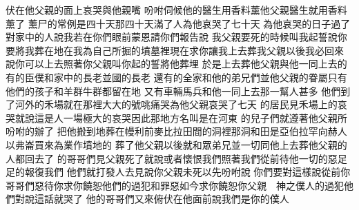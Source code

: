\bchapter%
伏在他父親的面上哀哭\chientien 與他親嘴\chuan 
{}吩咐伺候他的醫生\chientien 用香料薰他父親\chientien 醫生就用香料薰了\chuan
{}薰尸的常例是四十天\chientien 那四十天滿了\chientien{}人為他哀哭了七十天\chuan\Chuan
{}為他哀哭的日子過了\chientien{}對家中的人說\chientien 我若在你們眼前蒙恩\chientien 請你們報告說\chientien 
{}我父親要死的時候\chientien 叫我起誓\chientien 說\chientien 你要將我葬在地\chientien 在我為自己所掘的墳墓裡\yuentien 現在求你讓我上去葬我父親\chientien 以後我必回來\chuan 
{}說\chientien 你可以上去\chientien 照著你父親叫你起的誓\chientien 將他葬埋\chuan 
{}於是上去葬他父親\yuentien 與他一同上去的\chientien 有的臣僕\chientien 和家中的長老\chientien 並國的長老\yuentien 
{}還有的全家\chientien 和他的弟兄們\chientien 並他父親的眷屬\chientien 只有他們的\chientien 孩子\chientien 和羊群\chientien 牛群\chientien 都留在地\yuentien 
{}又有車輛\chientien 馬兵\chientien 和他一同上去\yuentien 那一幫人甚多\chuan 
{}他們到了河外\chientien{}的禾場\chientien 就在那裡大大的號咷痛哭\yuentien{}為他父親哀哭了七天\chuan 
{}的居民\chientien 見禾場上的哀哭\chientien 就說\chientien 這是人一場極大的哀哭\chientien 因此那地方名叫\chientien 是在河東\chuan 
{}的兒子們\chientien 就遵著他父親所吩咐的辦了\chientien 
{}把他搬到地\chientien 葬在幔利前\chientien 麥比拉田間的洞裡\yuentien 那洞和田\chientien 是亞伯拉罕向赫人以弗崙買來為業作墳地的\chuan 
{}葬了他父親以後\chientien 就和眾弟兄\chientien 並一切同他上去葬他父親的人\chientien 都回去了\chuan\Chuan
{}的哥哥們見父親死了\chientien 就說\chientien 或者懷恨我們\chientien 照著我們從前待他一切的惡\chientien 足足的報復我們\chuan 
{}他們就打發人去見說\chientien 你父親未死以先\chientien 吩咐說\chientien 
{}你們要對這樣說\chientien 從前你哥哥們惡待你\chientien 求你饒恕他們的過犯\chientien 和罪惡\yuentien 如今求你饒恕你父親　神之僕人的過犯\yuentien 他們對說這話\chientien{}就哭了\chuan 
{}他的哥哥們又來俯伏在他面前說\chientien 我們是你的僕人\chuan 
